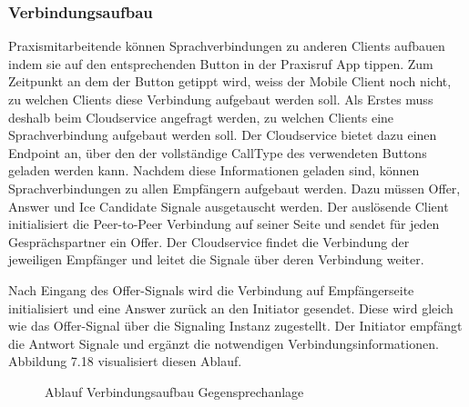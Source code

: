 \clearpage

\subsubsection{Verbindungsaufbau}

Praxismitarbeitende können Sprachverbindungen zu anderen Clients aufbauen indem sie auf den entsprechenden Button in der Praxisruf App tippen.
Zum Zeitpunkt an dem der Button getippt wird, weiss der Mobile Client noch nicht, zu welchen Clients diese Verbindung aufgebaut werden soll.
Als Erstes muss deshalb beim Cloudservice angefragt werden, zu welchen Clients eine Sprachverbindung aufgebaut werden soll.
Der Cloudservice bietet dazu einen Endpoint an, über den der vollständige CallType des verwendeten Buttons geladen werden kann.
Nachdem diese Informationen geladen sind, können Sprachverbindungen zu allen Empfängern aufgebaut werden.
Dazu müssen Offer, Answer und Ice Candidate Signale ausgetauscht werden.
Der auslösende Client initialisiert die Peer-to-Peer Verbindung auf seiner Seite und sendet für jeden Gesprächspartner ein Offer.
Der Cloudservice findet die Verbindung der jeweiligen Empfänger und leitet die Signale über deren Verbindung weiter.

Nach Eingang des Offer-Signals wird die Verbindung auf Empfängerseite initialisiert und eine Answer zurück an den Initiator gesendet.
Diese wird gleich wie das Offer-Signal über die Signaling Instanz zugestellt.
Der Initiator empfängt die Antwort Signale und ergänzt die notwendigen Verbindungsinformationen.
Abbildung 7.18 visualisiert diesen Ablauf.

\begin{figure}[h]
    \centering
    \begin{minipage}[b]{0.9\textwidth}
        \caption{Ablauf Verbindungsaufbau Gegensprechanlage}
    \end{minipage}
\end{figure}


